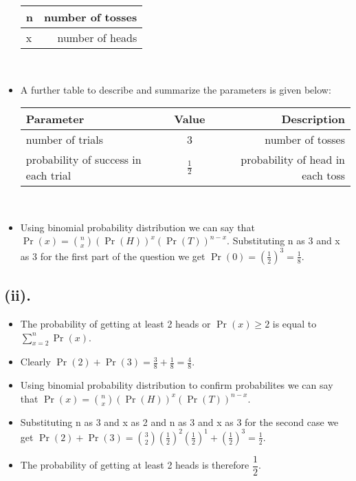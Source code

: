 \documentclass{article}
\begin{document}
\begin{itemize}
\begin{tabular}{|l|r|}
			n & number of tosses\\
			\hline
			x & number of heads\\
			\hline
		\end{tabular}\\[4pt]
		\item A further table to describe and summarize the parameters is given below:\\[4pt]
		\begin{tabular}{|l|c|r|}
			\hline
			Parameter & Value & Description\\
			\hline
			number of trials & 3 & number of tosses\\
			\hline
			probability of success in each trial & $\frac{1}{2}$ &  probability of head in each toss\\[3pt]
			\hline
		\end{tabular}\\[4pt]
		\item Using binomial probability distribution we can say that $\Pr(x)={n\choose x}(\Pr(H))^x(\Pr(T))^{n-x}$. Substituting n as 3 and x as 3 for the first part of the question we get $\Pr(0)=(\frac{1}{2})^3=\frac{1}{8}$.
	\end{itemize}
	
	\subsection*{(ii).}
	\begin{itemize}
		\item The probability of getting at least 2 heads or $\Pr(x)\geq 2$ is equal to $\sum_{x=2}^{n}\Pr(x)$. \\[4pt]
		\item Clearly $\Pr(2)+\Pr(3)= \frac{3}{8}+\frac{1}{8}= \frac{4}{8}$.\\[4pt]
		\item Using binomial probability distribution to confirm probabilites we can say that $\Pr(x)={n\choose x}(\Pr(H))^x(\Pr(T))^{n-x}$.\\[4pt]
		\item Substituting n as 3 and x as 2 and n as 3 and x as 3 for the second case we get $\Pr(2)+\Pr(3)={3\choose 2}(\frac{1}{2})^2(\frac{1}{2})^1+(\frac{1}{2})^3=\frac{1}{2}$.\\[4pt]
		\item The probability of getting at least 2 heads is therefore $\dfrac{1}{2}$.
	\end{itemize}
\end{document}
